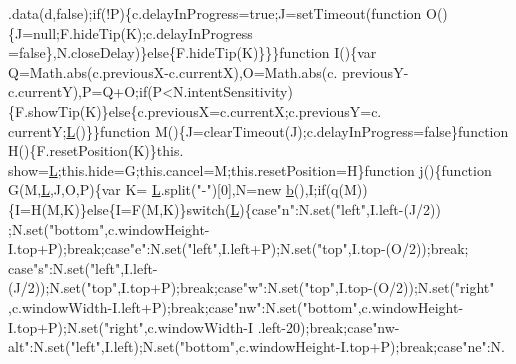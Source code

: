\begin{DoxyCode}
{      .data(d,\textcolor{keyword}{false});\textcolor{keywordflow}{if}(!P)\{c.delayInProgress=\textcolor{keyword}{true};J=setTimeout(\textcolor{keyword}{function} O()\{J=null;F.hideTip(K);c.delayInProgress
      =\textcolor{keyword}{false}\},N.closeDelay)\}\textcolor{keywordflow}{else}\{F.hideTip(K)\}\}\}\textcolor{keyword}{function} I()\{var Q=Math.abs(c.previousX-c.currentX),O=Math.abs(c.
      previousY-c.currentY),P=Q+O;\textcolor{keywordflow}{if}(P<N.intentSensitivity)\{F.showTip(K)\}\textcolor{keywordflow}{else}\{c.previousX=c.currentX;c.previousY=c.
      currentY;\hyperlink{jquery_8js_a38ee4c0b5f4fe2a18d0c783af540d253}{L}()\}\}\textcolor{keyword}{function} M()\{J=clearTimeout(J);c.delayInProgress=\textcolor{keyword}{false}\}\textcolor{keyword}{function} H()\{F.resetPosition(K)\}this.
      show=\hyperlink{jquery_8js_a38ee4c0b5f4fe2a18d0c783af540d253}{L};this.hide=G;this.cancel=M;this.resetPosition=H\}\textcolor{keyword}{function} j()\{\textcolor{keyword}{function} G(M,\hyperlink{jquery_8js_a38ee4c0b5f4fe2a18d0c783af540d253}{L},J,O,P)\{var K=
      \hyperlink{jquery_8js_a38ee4c0b5f4fe2a18d0c783af540d253}{L}.split(\textcolor{stringliteral}{"-"})[0],N=\textcolor{keyword}{new} \hyperlink{jquery_8js_aa4026ad5544b958e54ce5e106fa1c805}{b}(),I;\textcolor{keywordflow}{if}(q(M))\{I=H(M,K)\}\textcolor{keywordflow}{else}\{I=F(M,K)\}\textcolor{keywordflow}{switch}(\hyperlink{jquery_8js_a38ee4c0b5f4fe2a18d0c783af540d253}{L})\{\textcolor{keywordflow}{case}\textcolor{stringliteral}{"n"}:N.set(\textcolor{stringliteral}{"left"},I.left-(J/2))
      ;N.set(\textcolor{stringliteral}{"bottom"},c.windowHeight-I.top+P);\textcolor{keywordflow}{break};\textcolor{keywordflow}{case}\textcolor{stringliteral}{"e"}:N.set(\textcolor{stringliteral}{"left"},I.left+P);N.set(\textcolor{stringliteral}{"top"},I.top-(O/2));\textcolor{keywordflow}{break};\textcolor{keywordflow}{
      case}\textcolor{stringliteral}{"s"}:N.set(\textcolor{stringliteral}{"left"},I.left-(J/2));N.set(\textcolor{stringliteral}{"top"},I.top+P);\textcolor{keywordflow}{break};\textcolor{keywordflow}{case}\textcolor{stringliteral}{"w"}:N.set(\textcolor{stringliteral}{"top"},I.top-(O/2));N.set(\textcolor{stringliteral}{"right"}
      ,c.windowWidth-I.left+P);\textcolor{keywordflow}{break};\textcolor{keywordflow}{case}\textcolor{stringliteral}{"nw"}:N.set(\textcolor{stringliteral}{"bottom"},c.windowHeight-I.top+P);N.set(\textcolor{stringliteral}{"right"},c.windowWidth-I
      .left-20);\textcolor{keywordflow}{break};\textcolor{keywordflow}{case}\textcolor{stringliteral}{"nw-alt"}:N.set(\textcolor{stringliteral}{"left"},I.left);N.set(\textcolor{stringliteral}{"bottom"},c.windowHeight-I.top+P);\textcolor{keywordflow}{break};\textcolor{keywordflow}{case}\textcolor{stringliteral}{"ne"}:N.
}
\end{DoxyCode}
